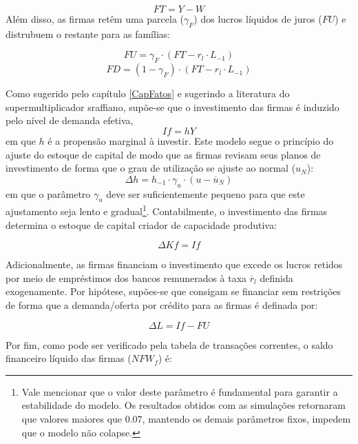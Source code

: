 \begin{equation}
    FT = Y - W
\end{equation}
Além disso, as firmas retêm uma parcela ($\gamma_F$) dos lucros líquidos de juros ($FU$) e distrubuem o restante para as famílias:

\begin{equation}
    FU = \gamma_F\cdot (FT - r_l\cdot L_{-1})
\end{equation}
\begin{equation}
    FD = (1-\gamma_F)\cdot (FT - r_l\cdot L_{-1})
\end{equation}

Como sugerido pelo capítulo \ref{CapFatos} e sugerindo a literatura do supermultiplicador sraffiano, supõe-se que o investimento das firmas é induzido pelo nível de demanda efetiva,
\begin{equation}
    If = hY
\end{equation}
em que $h$ é a propensão marginal à investir. Este modelo segue o princípio do ajuste do estoque de capital de modo que as firmas revisam seus planos de investimento de forma que o grau de utilização se ajuste ao normal ($u_N$):
\begin{equation}
    \Delta h = h_{-1}\cdot \gamma_u\cdot (u - \overline{u}_N)
\end{equation}
em que o parâmetro $\gamma_u$ deve ser suficientemente pequeno para que este ajustamento seja lento e gradual\footnote{Vale mencionar que o valor deste parâmetro é fundamental para garantir a estabilidade do modelo. Os resultados obtidos com as simulações retornaram que valores maiores que 0.07, mantendo os demais parâmetros fixos, impedem que o modelo não colapse.}. Contabilmente, o investimento das firmas determina o estoque de capital criador de capacidade produtiva:

\begin{equation}
    \Delta Kf = If
\end{equation}

Adicionalmente, as firmas financiam o investimento que excede os lucros retidos por meio de empréstimos dos bancos remunerados à taxa $\overline r_l$ definida exogenamente. Por hipótese, supões-se que consigam se financiar sem restrições de forma que a demanda/oferta por crédito para as firmas é definada por:

\begin{equation}
    \Delta L = If - FU
\end{equation}

Por fim, como pode ser verificado pela tabela de transações correntes, o saldo financeiro líquido das firmas ($NFW_f$) é:

